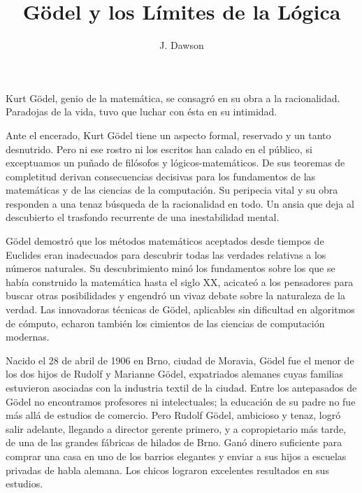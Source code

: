 \documentclass[a4paper, 12pt]{article}
\title{Gödel y los Límites de la Lógica}
\author{J. Dawson}
\date{}
\begin{document}
\begin{tcolorbox}[colback=blue!5!white,colframe=blue!75!black]

\vspace{-1.8cm}
\textbf \maketitle

\end{tcolorbox}

\bigskip





Kurt Gödel, genio de la matemática, se consagró en su obra a la racionalidad. Paradojas de la vida, tuvo que luchar con ésta en su intimidad.

Ante el encerado, Kurt Gödel tiene un aspecto formal, reservado y un tanto desnutrido. Pero ni ese rostro ni los escritos han calado en el público, si exceptuamos un puñado de filósofos y lógicos-matemáticos. De sus teoremas de completitud derivan consecuencias decisivas para los fundamentos de las matemáticas y de las ciencias de la computación. Su peripecia vital y su obra responden a una tenaz búsqueda de la racionalidad en todo. Un ansia que deja al descubierto el trasfondo recurrente de una inestabilidad mental.

Gödel demostró que los métodos matemáticos aceptados desde tiempos de Euclides eran inadecuados para descubrir todas las verdades relativas a los números naturales. Su descubrimiento minó los fundamentos sobre los que se había construido la matemática hasta el siglo XX, acicateó a los pensadores para buscar otras posibilidades y engendró un vivaz debate sobre la naturaleza de la verdad. Las innovadoras técnicas de Gödel, aplicables sin dificultad en algoritmos de cómputo, echaron también los cimientos de las ciencias de computación modernas.

Nacido el 28 de abril de 1906 en Brno, ciudad de Moravia, Gödel fue el menor de los dos hijos de Rudolf y Marianne Gödel, expatriados alemanes cuyas familias estuvieron asociadas con la industria textil de la ciudad. Entre los antepasados de Gödel no encontramos profesores ni intelectuales; la educación de su padre no fue más allá de estudios de comercio. Pero Rudolf Gödel, ambicioso y tenaz, logró salir adelante, llegando a director gerente primero, y a copropietario más tarde, de una de las grandes fábricas de hilados de Brno. Ganó dinero suficiente para comprar una casa en uno de los barrios elegantes y enviar a sus hijos a escuelas privadas de habla alemana. Los chicos lograron excelentes resultados en sus estudios.
\end{document}

